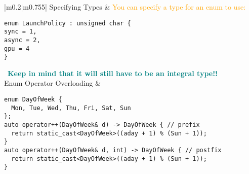 \documentclass[main.tex,fontsize=8pt,paper=a4,paper=portrait,DIV=calc,]{scrartcl}
\begin{document}
\pagebreak
\begin{table}[ht!]
\begin{tabular}{|m{0.2\linewidth}|m{0.755\linewidth}|}
\hline
Specifying Types & 
\textcolor{orange}{You can specify a type for an enum to use:}\newline
\begin{lstlisting}
enum LaunchPolicy : unsigned char {
sync = 1,
async = 2,
gpu = 4
}
\end{lstlisting} 
\, \newline
\textcolor{teal}{\textbf{Keep in mind that it will still have to be an integral type!!}}\\
\hline
Enum Operator Overloading & 
\begin{lstlisting}
enum DayOfWeek {
  Mon, Tue, Wed, Thu, Fri, Sat, Sun
};
auto operator++(DayOfWeek& d) -> DayOfWeek { // prefix
  return static_cast<DayOfWeek>((aday + 1) % (Sun + 1));
}
auto operator++(DayOfWeek& d, int) -> DayOfWeek { // postfix
  return static_cast<DayOfWeek>((aday + 1) % (Sun + 1));
}
\end{lstlisting}\\
\hline
\end{tabular}

\end{table}
\end{document}
